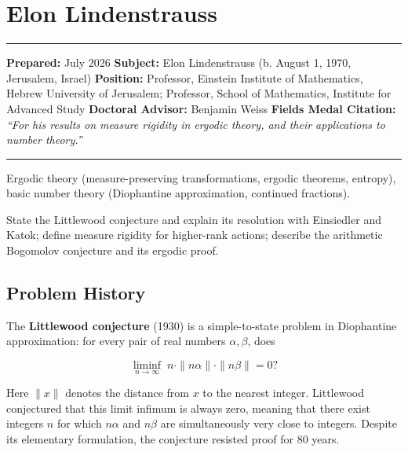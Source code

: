 \chapter{Elon Lindenstrauss}\label{ch2010elonlindenstrauss:elon-lindenstrauss-fields-medal-2010-a-comprehensive-report-on-his-work-and-impact}

\begin{center}\rule{0.5\linewidth}{0.5pt}\end{center}

\textbf{Prepared:} July 2026 \textbf{Subject:} Elon Lindenstrauss (b. August 1, 1970, Jerusalem, Israel) \textbf{Position:} Professor, Einstein Institute of Mathematics, Hebrew University of Jerusalem; Professor, School of Mathematics, Institute for Advanced Study \textbf{Doctoral Advisor:} Benjamin Weiss \textbf{Fields Medal Citation:} \emph{``For his results on measure rigidity in ergodic theory, and their applications to number theory.''}

\begin{center}\rule{0.5\linewidth}{0.5pt}\end{center}

\begin{prereqs} Ergodic theory (measure-preserving transformations, ergodic theorems, entropy), basic number theory (Diophantine approximation, continued fractions). \end{prereqs}

\begin{objectives} State the Littlewood conjecture and explain its resolution with Einsiedler and Katok; define measure rigidity for higher-rank actions; describe the arithmetic Bogomolov conjecture and its ergodic proof. \end{objectives}

\section{Problem History}\label{ch2010elonlindenstrauss:problem-history}

The \textbf{Littlewood conjecture} (1930) is a simple-to-state problem in Diophantine approximation: for every pair of real numbers $\alpha, \beta$, does

\[
\liminf_{n \to \infty} \; n \cdot \|n\alpha\| \cdot \|n\beta\| = 0?
\]

Here $\|x\|$ denotes the distance from $x$ to the nearest integer. Littlewood conjectured that this limit infimum is always zero, meaning that there exist integers $n$ for which $n\alpha$ and $n\beta$ are simultaneously very close to integers. Despite its elementary formulation, the conjecture resisted proof for 80 years.


